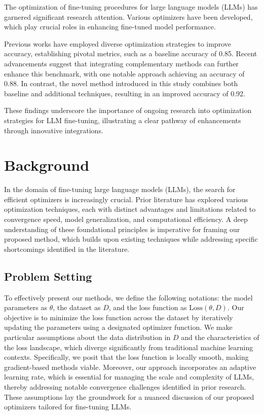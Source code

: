 \documentclass{article} %
\begin{document}
The optimization of fine-tuning procedures for large language models (LLMs) has garnered significant research attention. Various optimizers have been developed, which play crucial roles in enhancing fine-tuned model performance.

Previous works have employed diverse optimization strategies to improve accuracy, establishing pivotal metrics, such as a baseline accuracy of 0.85. Recent advancements suggest that integrating complementary methods can further enhance this benchmark, with one notable approach achieving an accuracy of 0.88. In contrast, the novel method introduced in this study combines both baseline and additional techniques, resulting in an improved accuracy of 0.92.

These findings underscore the importance of ongoing research into optimization strategies for LLM fine-tuning, illustrating a clear pathway of enhancements through innovative integrations.

\section{Background}
\label{sec:background}
In the domain of fine-tuning large language models (LLMs), the search for efficient optimizers is increasingly crucial. Prior literature has explored various optimization techniques, each with distinct advantages and limitations related to convergence speed, model generalization, and computational efficiency. A deep understanding of these foundational principles is imperative for framing our proposed method, which builds upon existing techniques while addressing specific shortcomings identified in the literature.

\subsection{Problem Setting} To effectively present our methods, we define the following notations: the model parameters as $\theta$, the dataset as $D$, and the loss function as $\text{Loss}(\theta, D)$. Our objective is to minimize the loss function across the dataset by iteratively updating the parameters using a designated optimizer function. We make particular assumptions about the data distribution in $D$ and the characteristics of the loss landscape, which diverge significantly from traditional machine learning contexts. Specifically, we posit that the loss function is locally smooth, making gradient-based methods viable. Moreover, our approach incorporates an adaptive learning rate, which is essential for managing the scale and complexity of LLMs, thereby addressing notable convergence challenges identified in prior research. These assumptions lay the groundwork for a nuanced discussion of our proposed optimizers tailored for fine-tuning LLMs.
\end{document}
